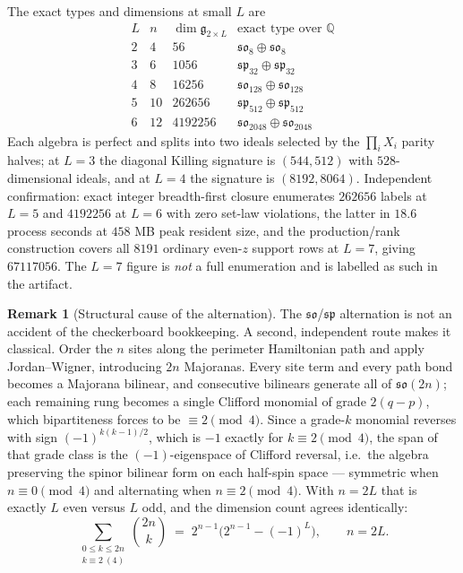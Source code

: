 \documentclass[11pt]{article}
\theoremstyle{definition}
\newtheorem{remark}[theorem]{Remark}
\newcommand{\Qb}{\mathbb{Q}}
\newcommand{\alg}{\mathfrak{g}}
\begin{document}
The exact types and dimensions at small $L$ are
\[
\begin{array}{c|c|r|l}
L & n & \dim\alg_{2\times L} & \text{exact type over }\Qb\\ \hline
2 & 4 & 56 & \mathfrak{so}_8\oplus\mathfrak{so}_8\\
3 & 6 & 1056 & \mathfrak{sp}_{32}\oplus\mathfrak{sp}_{32}\\
4 & 8 & 16256 & \mathfrak{so}_{128}\oplus\mathfrak{so}_{128}\\
5 & 10 & 262656 & \mathfrak{sp}_{512}\oplus\mathfrak{sp}_{512}\\
6 & 12 & 4192256 & \mathfrak{so}_{2048}\oplus\mathfrak{so}_{2048}
\end{array}
\]
Each algebra is perfect and splits into two ideals selected by the $\prod_iX_i$ parity halves; at
$L=3$ the diagonal Killing signature is $(544,512)$ with $528$-dimensional ideals, and at $L=4$ the
signature is $(8192,8064)$. Independent confirmation: exact integer breadth-first closure enumerates
$262656$ labels at $L=5$ and $4192256$ at $L=6$ with zero set-law violations, the latter in
$18.6$ process seconds at $458$ MB peak resident size, and the production/rank construction covers all
$8191$ ordinary even-$z$ support rows at $L=7$, giving $67117056$. The $L=7$ figure is \emph{not} a
full enumeration and is labelled as such in the artifact.

\begin{remark}[Structural cause of the alternation]
The $\mathfrak{so}$/$\mathfrak{sp}$ alternation is not an accident of the checkerboard bookkeeping. A
second, independent route makes it classical. Order the $n$ sites along the perimeter Hamiltonian path
and apply Jordan--Wigner, introducing $2n$ Majoranas. Every site term and every path bond becomes a
Majorana bilinear, and consecutive bilinears generate all of $\mathfrak{so}(2n)$; each remaining rung
becomes a single Clifford monomial of grade $2(q-p)$, which bipartiteness forces to be
$\equiv2\pmod4$. Since a grade-$k$ monomial reverses with sign $(-1)^{k(k-1)/2}$, which is $-1$
exactly for $k\equiv2\pmod4$, the span of that grade class is the $(-1)$-eigenspace of Clifford
reversal, i.e.\ the algebra preserving the spinor bilinear form on each half-spin space --- symmetric
when $n\equiv0\pmod4$ and alternating when $n\equiv2\pmod4$. With $n=2L$ that is exactly $L$ even
versus $L$ odd, and the dimension count agrees identically:
\[
\sum_{\substack{0\le k\le 2n\\ k\equiv2\ (4)}}\binom{2n}{k}
\;=\;2^{n-1}\bigl(2^{n-1}-(-1)^{L}\bigr),\qquad n=2L .
\]
\end{remark}
\end{document}
